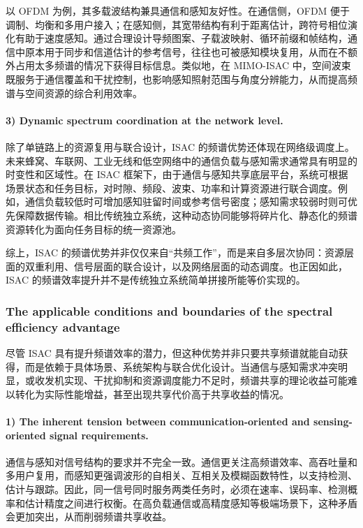 以 OFDM 为例，其多载波结构兼具通信和感知友好性。在通信侧，OFDM 便于调制、均衡和多用户接入；在感知侧，其宽带结构有利于距离估计，跨符号相位演化有助于速度感知。通过合理设计导频图案、子载波映射、循环前缀和帧结构，通信中原本用于同步和信道估计的参考信号，往往也可被感知模块复用，从而在不额外占用太多频谱的情况下获得目标信息\cite{Ma2022WiFiSensingSurvey,Kumari2018IEEE80211adRadar}。类似地，在 MIMO-ISAC 中，空间波束既服务于通信覆盖和干扰控制，也影响感知照射范围与角度分辨能力，从而提高频谱与空间资源的综合利用效率\cite{Liu2020JointRadarComm,Liu2022ISAC}。

\paragraph{3) Dynamic spectrum coordination at the network level.}
除了单链路上的资源复用与联合设计，ISAC 的频谱优势还体现在网络级调度上。未来蜂窝、车联网、工业无线和低空网络中的通信负载与感知需求通常具有明显的时变性和区域性\cite{Saad2020Vision6G,Cui2024integrated,IMT2030Framework}。在 ISAC 框架下，由于通信与感知共享底层平台，系统可根据场景状态和任务目标，对时隙、频段、波束、功率和计算资源进行联合调度\cite{Zhang2020perceptive,Cui2024integrated}。例如，通信负载较低时可增加感知驻留时间或参考信号密度；感知需求较弱时则可优先保障数据传输。相比传统独立系统，这种动态协同能够将碎片化、静态化的频谱资源转化为面向任务目标的统一资源池。

综上，ISAC 的频谱优势并非仅仅来自“共频工作”，而是来自多层次协同：资源层面的双重利用、信号层面的联合设计，以及网络层面的动态调度。也正因如此，ISAC 的频谱效率提升并不是传统独立系统简单拼接所能等价实现的。

\subsubsection{The applicable conditions and boundaries of the spectral efficiency advantage}
\label{subsubsec:ch1-isac-core value-spectrum-boundary}

尽管 ISAC 具有提升频谱效率的潜力，但这种优势并非只要共享频谱就能自动获得，而是依赖于具体场景、系统架构与联合优化设计。当通信与感知需求冲突明显，或收发机实现、干扰抑制和资源调度能力不足时，频谱共享的理论收益可能难以转化为实际性能增益，甚至出现共享代价高于共享收益的情况。

\paragraph{1) The inherent tension between communication-oriented and sensing-oriented signal requirements.}
通信与感知对信号结构的要求并不完全一致。通信更关注高频谱效率、高吞吐量和多用户复用，而感知更强调波形的自相关、互相关及模糊函数特性，以支持检测、估计与跟踪\cite{SkolnikRadarBook}。因此，同一信号同时服务两类任务时，必须在速率、误码率、检测概率和估计精度之间进行权衡。在高负载通信或高精度感知等极端场景下，这种矛盾会更加突出，从而削弱频谱共享收益。

